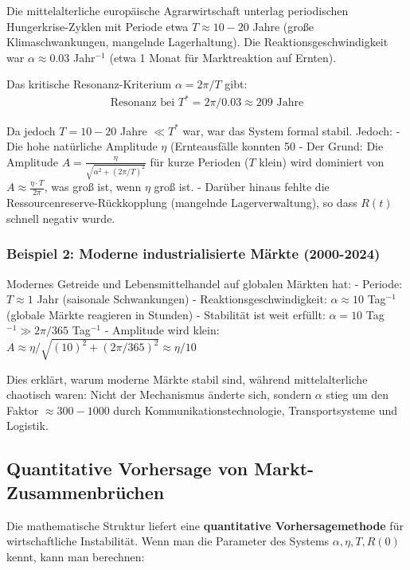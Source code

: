 \documentclass[a4paper, 12pt, twoside, openright]{report}
\theoremstyle{definition}
\theoremstyle{definition}
\begin{document}
Die mittelalterliche europäische Agrarwirtschaft unterlag periodischen Hungerkrise-Zyklen mit Periode etwa $T \approx 10-20$ Jahre (große Klimaschwankungen, mangelnde Lagerhaltung). Die Reaktionsgeschwindigkeit war $\alpha \approx 0.03$ Jahr$^{-1}$ (etwa 1 Monat für Marktreaktion auf Ernten).

Das kritische Resonanz-Kriterium $\alpha = 2\pi/T$ gibt:
\begin{align}
\text{Resonanz bei } T^* = 2\pi / 0.03 \approx 209 \text{ Jahre}
\end{align}

Da jedoch $T = 10-20$ Jahre $\ll T^*$ war, war das System formal stabil. Jedoch:
- Die hohe natürliche Amplitude $\eta$ (Ernteausfälle konnten 50%
- Der Grund: Die Amplitude $A = \frac{\eta}{\sqrt{\alpha^2 + (2\pi/T)^2}}$ für kurze Perioden ($T$ klein) wird dominiert von $A \approx \frac{\eta \cdot T}{2\pi}$, was groß ist, wenn $\eta$ groß ist.
- Darüber hinaus fehlte die Ressourcenreserve-Rückkopplung (mangelnde Lagerverwaltung), so dass $R(t)$ schnell negativ wurde.

\subsubsection{Beispiel 2: Moderne industrialisierte Märkte (2000-2024)}

Modernes Getreide und Lebensmittelhandel auf globalen Märkten hat:
- Periode: $T \approx 1$ Jahr (saisonale Schwankungen)
- Reaktionsgeschwindigkeit: $\alpha \approx 10$ Tag$^{-1}$ (globale Märkte reagieren in Stunden)
- Stabilität ist weit erfüllt: $\alpha = 10$ Tag$^{-1} \gg 2\pi/365$ Tag$^{-1}$
- Amplitude wird klein: $A \approx \eta / \sqrt{(10)^2 + (2\pi/365)^2} \approx \eta / 10$

Dies erklärt, warum moderne Märkte stabil sind, während mittelalterliche chaotisch waren: Nicht der Mechanismus änderte sich, sondern $\alpha$ stieg um den Faktor $\approx 300-1000$ durch Kommunikationstechnologie, Transportsysteme und Logistik.

\subsection{Quantitative Vorhersage von Markt-Zusammenbrüchen}

Die mathematische Struktur liefert eine \textbf{quantitative Vorhersagemethode} für wirtschaftliche Instabilität. Wenn man die Parameter des Systems $\alpha, \eta, T, R(0)$ kennt, kann man berechnen:
\end{document}
